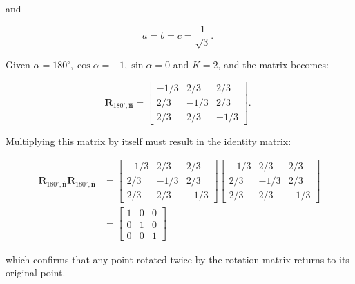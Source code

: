 and

$$
a=b=c=\frac{1}{\sqrt{3}} \text {. }
$$

Given $\alpha=180^{\circ}, \cos \alpha=-1, \sin \alpha=0$ and $K=2$, and the matrix becomes:

$$
\mathbf{R}_{180^{\circ}, \hat{\mathbf{n}}}=\left[\begin{array}{ccc}
-1 / 3 & 2 / 3 & 2 / 3 \\
2 / 3 & -1 / 3 & 2 / 3 \\
2 / 3 & 2 / 3 & -1 / 3
\end{array}\right] \text {. }
$$

Multiplying this matrix by itself must result in the identity matrix:

$$
\begin{aligned}
\mathbf{R}_{180^{\circ}, \hat{\mathbf{n}}} \mathbf{R}_{180^{\circ}, \hat{\mathbf{n}}} & =\left[\begin{array}{ccc}
-1 / 3 & 2 / 3 & 2 / 3 \\
2 / 3 & -1 / 3 & 2 / 3 \\
2 / 3 & 2 / 3 & -1 / 3
\end{array}\right]\left[\begin{array}{ccc}
-1 / 3 & 2 / 3 & 2 / 3 \\
2 / 3 & -1 / 3 & 2 / 3 \\
2 / 3 & 2 / 3 & -1 / 3
\end{array}\right] \\
& =\left[\begin{array}{ccc}
1 & 0 & 0 \\
0 & 1 & 0 \\
0 & 0 & 1
\end{array}\right]
\end{aligned}
$$

which confirms that any point rotated twice by the rotation matrix returns to its original point.
